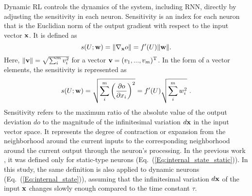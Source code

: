 Dynamic RL controls the dynamics of the system, including RNN, directly by adjusting the sensitivity \citep{Sensitivity} in each neuron.
Sensitivity is an index for each neuron that is the Euclidian norm of the output gradient
with respect to the input vector ${\bf x}$.
It is defined as
\begin{equation}
s(U; {\bf w}) = \|\nabla_{\bf x} o\| = f'(U)\|{\bf w}\|.
\label{Eq:sensitivity}
\end{equation}
Here, $\| {\bf v} \| = \sqrt{\sum_i^mv_i^2}$ for a vector ${\bf v}=(v_1, ..., v_m)^\mathrm{T}$.
In the form of a vector elements, the sensitivity is represented as
\begin{equation}
s(U; {\bf w}) = \sqrt{\sum_i^m \left( \frac{\partial o}{\partial x_i} \right)^2} = f'(U)\sqrt{\sum_i^m w_i^2}\ .
\label{Eq:sensitivity_non_vector}
\end{equation}
Sensitivity refers to the maximum ratio of the absolute value of the output deviation $do$
to the magnitude of the infinitesimal variation $d{\bf x}$ in the input vector space.
It represents the degree of contraction or expansion from the neighborhood around the current inputs
to the corresponding neighborhood around the current output through the neuron's processing.
In the previous work \citep{Sensitivity}, it was defined only for static-type neurons
(Eq.~(\ref{Eq:internal_state_static})).
In this study, the same definition is also applied to dynamic neurons (Eq.~(\ref{Eq:internal_state})),
assuming that the infinitesimal variation $d{\bf x}$ of the input ${\bf x}$
changes slowly enough compared to the time constant $\tau$.

